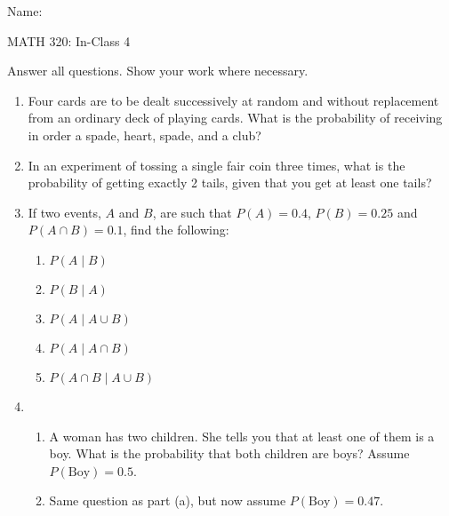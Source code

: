 \documentclass{article}
\begin{document}
\hspace{375pt}Name:

\begin{center}
{\Huge MATH 320: In-Class 4}

\end{center}

\bigskip\bigskip


Answer all questions. Show your work where necessary.\bigskip


\begin{enumerate}
    \item Four cards are to be dealt successively at random and without replacement from an ordinary deck of playing cards. What is the probability of receiving in order a spade, heart, spade, and a club?\vspace{40pt}%
    
    \item In an experiment of tossing a single fair coin three times, what is the probability of getting exactly 2 tails, given that you get at least one tails?\vspace{100pt}%
    \item If two events, $A$ and $B$, are such that $P(A) = 0.4$, $P(B) = 0.25$ and $P(A \cap B) = 0.1$, find the following:%
    \begin{enumerate}
        \item $P(A \mid B)$\vspace{30pt}
        \item $P(B \mid A)$\vspace{30pt}
        \item $P(A \mid A \cup B)$\vspace{30pt}
        \item $P(A \mid A \cap B)$\vspace{30pt}
        \item $P(A \cap B \mid A \cup B)$\vspace{30pt}
    \end{enumerate}\bigskip
    
    \item 
    \begin{enumerate}
        \item A woman has two children. She tells you that at least one of them is a boy. What is the probability that both children are boys? Assume $P(\text{Boy}) = 0.5$.\vspace{50pt}%
        \item Same question as part (a), but now assume $P(\text{Boy}) = 0.47$.\vspace{70pt}
    \end{enumerate}


\end{enumerate}
\end{document}
